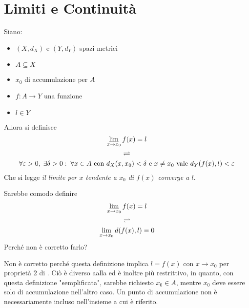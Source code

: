 \section{Limiti e Continuità}
\begin{definition}
	\label{def:lim_funz}
	Siano:
	\begin{itemize}[noitemsep]
		\item $(X,d_X)$ e $(Y,d_Y)$ spazi metrici
		\item $A \subseteq X$
		\item $x_0$ di accumulazione per $A$
		\item $f: A \to Y$ una funzione
		\item $l \in Y$
	\end{itemize}
	Allora si definisce
	\begin{equation*}
		\begin{gathered}
			\lim\limits_{x \to x_0} f(x) = l\\
			\rightleftharpoons\\
			\forall \varepsilon > 0,\; \exists \delta > 0:\; \forall x \in A \text{ con } d_X(x,x_0) < \delta \text{ e } x \neq x_0 \text{ vale } d_Y(f(x),l)<\varepsilon
		\end{gathered}
	\end{equation*}
	Che si legge \textit{il limite per $x$ tendente a $x_0$ di $f(x)$ converge a $l$}.
\end{definition}
\begin{exercise}
	Sarebbe comodo definire
	\begin{equation*}
		\begin{gathered}
			\lim\limits_{x \to x_0} f(x) = l\\
			\rightleftharpoons\\
			\lim\limits_{x \to x_0} d(f(x), l) = 0
		\end{gathered}
	\end{equation*}
	Perché non è corretto farlo?
	\begin{solution}
		Non è corretto perché questa definizione implica $l = f(x)$ con $x \to x_0$ per proprietà 2 di . Ciò è diverso aalla  ed è inoltre più restrittivo, in quanto, con questa definizione "semplificata", sarebbe richiesto $x_0 \in A$, mentre $x_0$ deve essere solo di accumulazione nell'altro caso. Un punto di accumulazione non è necessariamente incluso nell'insieme a cui è riferito.
	\end{solution}
\end{exercise}

